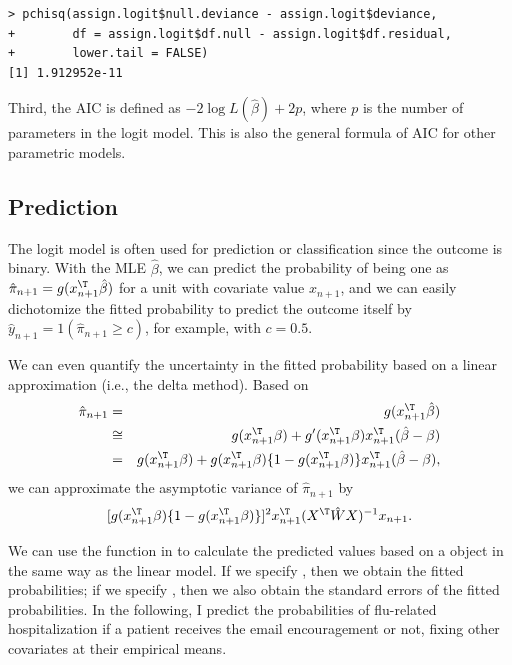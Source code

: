 \begin{lstlisting}
> pchisq(assign.logit$null.deviance - assign.logit$deviance,
+        df = assign.logit$df.null - assign.logit$df.residual,
+        lower.tail = FALSE)
[1] 1.912952e-11
\end{lstlisting}


Third, the AIC is defined as $- 2 \log L(\hat{\beta}) + 2p$, where $p$ is the number of parameters in the logit model. This is also the general formula of AIC for other parametric models. 


\subsection{Prediction}

The logit model is often used for prediction or classification since the outcome is binary. With the MLE $\hat{\beta}$, we can predict the probability of being one as $\hat{\pi}_{n+1}  =  g(x_{n+1} ^{\T} \hat{\beta})$ for a unit with covariate value $x_{n+1} $, and we can easily dichotomize the fitted probability to predict the outcome itself by $\hat{y}_{n+1}  =  1(\hat{\pi}_{n+1}  \geq c)$, for example, with $c=0.5$. 


We can even quantify the uncertainty in the fitted probability based on a linear approximation (i.e., the delta method). Based on
\begin{eqnarray*}
\hat{\pi}_{n+1}   &=&  g(x_{n+1} ^{\T} \hat{\beta}) \\
&\cong&   g(x_{n+1} ^{\T} \beta) +  g'(x_{n+1} ^{\T}  \beta) x_{n+1} ^{\T} (\hat{\beta} - \beta) \\
&=&  g(x_{n+1} ^{\T} \beta) +  g(x_{n+1} ^{\T}  \beta )  \{1-g(x_{n+1} ^{\T}  \beta ) \} x_{n+1} ^{\T} (\hat{\beta} - \beta),
\end{eqnarray*}
we can approximate the asymptotic variance of $\hat{\pi}_{n+1}  $ by
$$
 [ g(x_{n+1} ^{\T}  \beta )  \{1-g(x_{n+1} ^{\T}  \beta ) \}  ]^2 x_{n+1} ^{\T}  (X^{\T}\hat{W}X)^{-1} x_{n+1} . 
$$


We can use the  function in  to calculate the predicted values based on a  object in the same way as the linear model. If we specify , then we obtain the fitted probabilities; if we specify , then we also obtain the standard errors of the fitted probabilities. In the following, I predict the probabilities of flu-related hospitalization if a patient receives the email encouragement or not, fixing other covariates at their empirical means. 



